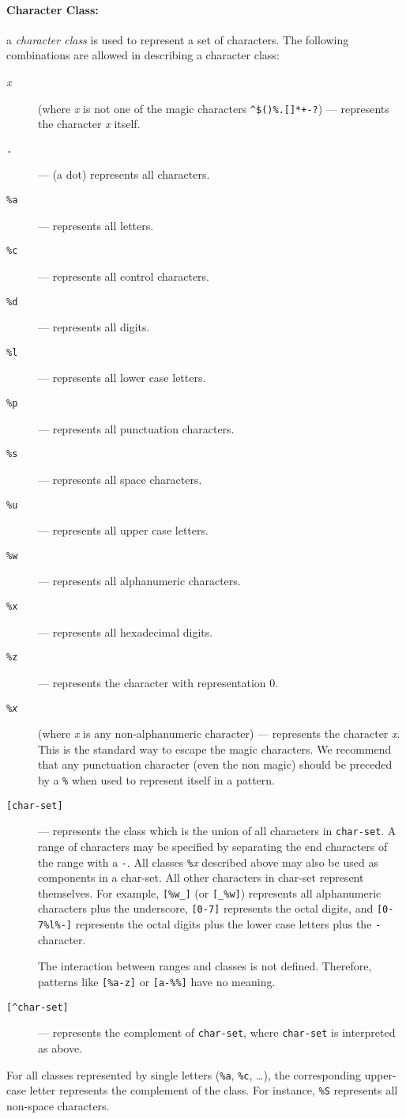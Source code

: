 \documentclass[11pt]{article}
\newcommand{\M}[1]{{\rm\emph{#1}}}
\newcommand{\T}[1]{{\tt #1}}
\newcommand{\Def}[1]{\emph{#1}\index{#1}}
\begin{document}
\paragraph{Character Class:}
a \Def{character class} is used to represent a set of characters.
The following combinations are allowed in describing a character class:
\begin{description}
\item[\emph{x}] (where \emph{x} is not one of the magic characters
\verb|^$()%.[]*+-?|)
--- represents the character \emph{x} itself.
\item[\T{.}] --- (a dot) represents all characters.
\item[\T{\%a}] --- represents all letters.
\item[\T{\%c}] --- represents all control characters.
\item[\T{\%d}] --- represents all digits.
\item[\T{\%l}] --- represents all lower case letters.
\item[\T{\%p}] --- represents all punctuation characters.
\item[\T{\%s}] --- represents all space characters.
\item[\T{\%u}] --- represents all upper case letters.
\item[\T{\%w}] --- represents all alphanumeric characters.
\item[\T{\%x}] --- represents all hexadecimal digits.
\item[\T{\%z}] --- represents the character with representation 0.
\item[\T{\%\M{x}}] (where \M{x} is any non-alphanumeric character)  ---
represents the character \M{x}.
This is the standard way to escape the magic characters.
We recommend that any punctuation character (even the non magic)
should be preceded by a \verb|%|
when used to represent itself in a pattern.

\item[\T{[char-set]}] ---
represents the class which is the union of all
characters in \verb|char-set|.
A range of characters may be specified by
separating the end characters of the range with a \verb|-|.
All classes \verb|%|\emph{x} described above may also be used as
components in a char-set.
All other characters in char-set represent themselves.
For example, \verb|[%w_]| (or \verb|[_%w]|)
represents all alphanumeric characters plus the underscore,
\verb|[0-7]| represents the octal digits,
and \verb|[0-7%l%-]| represents the octal digits plus
the lower case letters plus the \verb|-| character.

The interaction between ranges and classes is not defined.
Therefore, patterns like \verb|[%a-z]| or \verb|[a-%%]|
have no meaning.

\item[\T{[\^\null char-set]}] ---
represents the complement of \verb|char-set|,
where \verb|char-set| is interpreted as above.
\end{description}
For all classes represented by single letters (\verb|%a|, \verb|%c|, \ldots),
the corresponding upper-case letter represents the complement of the class.
For instance, \verb|%S| represents all non-space characters.
\end{document}
